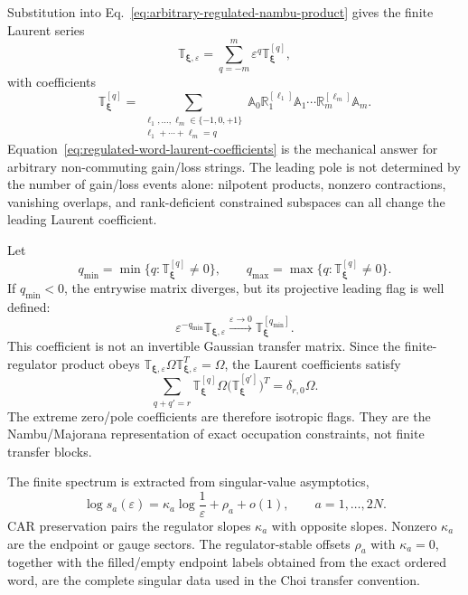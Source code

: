 \documentclass[aps,prb,onecolumn,nofootinbib,superscriptaddress]{revtex4-2}
\newcommand{\bxi}{{\boldsymbol{\xi}}}
\theoremstyle{plain}
\theoremstyle{definition}
\begin{document}
Substitution into Eq.~\eqref{eq:arbitrary-regulated-nambu-product} gives the
finite Laurent series
\begin{equation}
  \mathbb T_{\bxi,\varepsilon}
  =
  \sum_{q=-m}^{m}\varepsilon^q
  \mathbb T_\bxi^{[q]},
  \label{eq:regulated-word-laurent-series}
\end{equation}
with coefficients
\begin{equation}
  \mathbb T_\bxi^{[q]}
  =
  \sum_{\substack{\ell_1,\ldots,\ell_m\in\{-1,0,+1\}\\
  \ell_1+\cdots+\ell_m=q}}
  \mathbb A_0\mathbb R_1^{[\ell_1]}\mathbb A_1\cdots
  \mathbb R_m^{[\ell_m]}\mathbb A_m .
  \label{eq:regulated-word-laurent-coefficients}
\end{equation}
Equation~\eqref{eq:regulated-word-laurent-coefficients} is the mechanical
answer for arbitrary non-commuting gain/loss strings.  The leading pole is
not determined by the number of gain/loss events alone: nilpotent products,
nonzero contractions, vanishing overlaps, and rank-deficient constrained
subspaces can all change the leading Laurent coefficient.

Let
\begin{equation}
  q_{\min}=\min\{q:\mathbb T_\bxi^{[q]}\ne0\},
  \qquad
  q_{\max}=\max\{q:\mathbb T_\bxi^{[q]}\ne0\}.
  \label{eq:word-laurent-extreme-powers}
\end{equation}
If \(q_{\min}<0\), the entrywise matrix diverges, but its projective leading
flag is well defined:
\begin{equation}
  \varepsilon^{-q_{\min}}\mathbb T_{\bxi,\varepsilon}
  \xrightarrow{\varepsilon\to0}
  \mathbb T_\bxi^{[q_{\min}]} .
  \label{eq:leading-laurent-flag}
\end{equation}
This coefficient is not an invertible Gaussian transfer matrix.  Since the
finite-regulator product obeys
\(\mathbb T_{\bxi,\varepsilon}\Omega\mathbb T_{\bxi,\varepsilon}^T=\Omega\),
the Laurent coefficients satisfy
\begin{equation}
  \sum_{q+q'=r}
  \mathbb T_\bxi^{[q]}\Omega
  \bigl(\mathbb T_\bxi^{[q']}\bigr)^T
  =
  \delta_{r,0}\Omega .
  \label{eq:laurent-orthogonality-identities}
\end{equation}
The extreme zero/pole coefficients are therefore isotropic flags.  They are
the Nambu/Majorana representation of exact occupation constraints, not
finite transfer blocks.

The finite spectrum is extracted from singular-value asymptotics,
\begin{equation}
  \log s_a(\varepsilon)
  =
  \kappa_a\log\frac{1}{\varepsilon}
  +
  \rho_a
  +
  o(1),
  \qquad
  a=1,\ldots,2N .
  \label{eq:regulated-singular-value-asymptotics}
\end{equation}
CAR preservation pairs the regulator slopes \(\kappa_a\) with opposite
slopes.  Nonzero \(\kappa_a\) are the endpoint or gauge sectors.  The
regulator-stable offsets \(\rho_a\) with \(\kappa_a=0\), together with the
filled/empty endpoint labels obtained from the exact ordered word, are the
complete singular data used in the Choi transfer convention.
\end{document}
